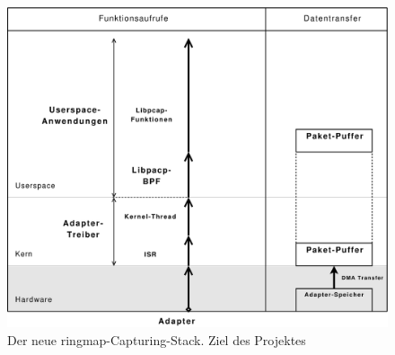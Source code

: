 \begin{figure}
	\begin{center}
	\includegraphics[width=4.9in]{bilder/1copy}
	\end{center}
	\caption{Der neue ringmap-Capturing-Stack. Ziel des Projektes}
	\label{img:new_stack}
\end{figure}

